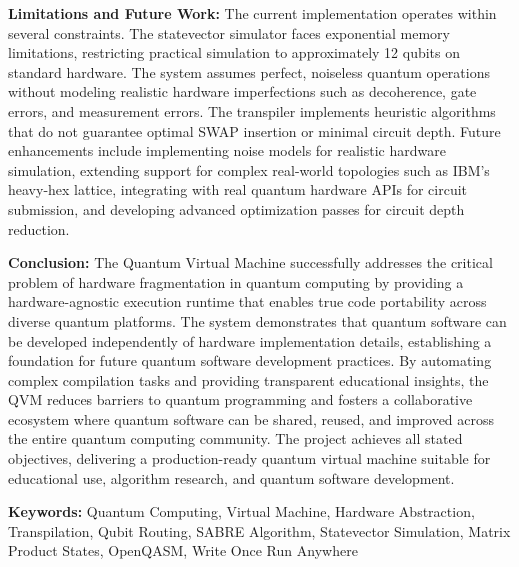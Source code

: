 \textbf{Limitations and Future Work:} The current implementation operates within several constraints. The statevector simulator faces exponential memory limitations, restricting practical simulation to approximately 12 qubits on standard hardware. The system assumes perfect, noiseless quantum operations without modeling realistic hardware imperfections such as decoherence, gate errors, and measurement errors. The transpiler implements heuristic algorithms that do not guarantee optimal SWAP insertion or minimal circuit depth. Future enhancements include implementing noise models for realistic hardware simulation, extending support for complex real-world topologies such as IBM's heavy-hex lattice, integrating with real quantum hardware APIs for circuit submission, and developing advanced optimization passes for circuit depth reduction.

\textbf{Conclusion:} The Quantum Virtual Machine successfully addresses the critical problem of hardware fragmentation in quantum computing by providing a hardware-agnostic execution runtime that enables true code portability across diverse quantum platforms. The system demonstrates that quantum software can be developed independently of hardware implementation details, establishing a foundation for future quantum software development practices. By automating complex compilation tasks and providing transparent educational insights, the QVM reduces barriers to quantum programming and fosters a collaborative ecosystem where quantum software can be shared, reused, and improved across the entire quantum computing community. The project achieves all stated objectives, delivering a production-ready quantum virtual machine suitable for educational use, algorithm research, and quantum software development.

\vspace{1cm}

\noindent\textbf{Keywords:} Quantum Computing, Virtual Machine, Hardware Abstraction, Transpilation, Qubit Routing, SABRE Algorithm, Statevector Simulation, Matrix Product States, OpenQASM, Write Once Run Anywhere

\vspace{0.5cm}

